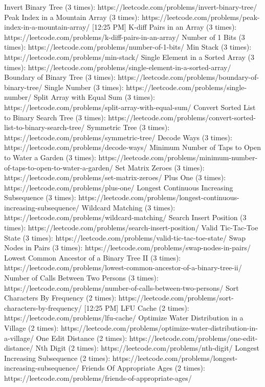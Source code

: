 Invert Binary Tree (3 times): https://leetcode.com/problems/invert-binary-tree/
Peak Index in a Mountain Array (3 times): https://leetcode.com/problems/peak-index-in-a-mountain-array/
[12:25 PM]
K-diff Pairs in an Array (3 times): https://leetcode.com/problems/k-diff-pairs-in-an-array/
Number of 1 Bits (3 times): https://leetcode.com/problems/number-of-1-bits/
Min Stack (3 times): https://leetcode.com/problems/min-stack/
Single Element in a Sorted Array (3 times): https://leetcode.com/problems/single-element-in-a-sorted-array/
Boundary of Binary Tree (3 times): https://leetcode.com/problems/boundary-of-binary-tree/
Single Number (3 times): https://leetcode.com/problems/single-number/
Split Array with Equal Sum (3 times): https://leetcode.com/problems/split-array-with-equal-sum/
Convert Sorted List to Binary Search Tree (3 times): https://leetcode.com/problems/convert-sorted-list-to-binary-search-tree/
Symmetric Tree (3 times): https://leetcode.com/problems/symmetric-tree/
Decode Ways (3 times): https://leetcode.com/problems/decode-ways/
Minimum Number of Taps to Open to Water a Garden (3 times): https://leetcode.com/problems/minimum-number-of-taps-to-open-to-water-a-garden/
Set Matrix Zeroes (3 times): https://leetcode.com/problems/set-matrix-zeroes/
Plus One (3 times): https://leetcode.com/problems/plus-one/
Longest Continuous Increasing Subsequence (3 times): https://leetcode.com/problems/longest-continuous-increasing-subsequence/
Wildcard Matching (3 times): https://leetcode.com/problems/wildcard-matching/
Search Insert Position (3 times): https://leetcode.com/problems/search-insert-position/
Valid Tic-Tac-Toe State (3 times): https://leetcode.com/problems/valid-tic-tac-toe-state/
Swap Nodes in Pairs (3 times): https://leetcode.com/problems/swap-nodes-in-pairs/
Lowest Common Ancestor of a Binary Tree II (3 times): https://leetcode.com/problems/lowest-common-ancestor-of-a-binary-tree-ii/
Number of Calls Between Two Persons (3 times): https://leetcode.com/problems/number-of-calls-between-two-persons/
Sort Characters By Frequency (2 times): https://leetcode.com/problems/sort-characters-by-frequency/
[12:25 PM]
LFU Cache (2 times): https://leetcode.com/problems/lfu-cache/
Optimize Water Distribution in a Village (2 times): https://leetcode.com/problems/optimize-water-distribution-in-a-village/
One Edit Distance (2 times): https://leetcode.com/problems/one-edit-distance/
Nth Digit (2 times): https://leetcode.com/problems/nth-digit/
Longest Increasing Subsequence (2 times): https://leetcode.com/problems/longest-increasing-subsequence/
Friends Of Appropriate Ages (2 times): https://leetcode.com/problems/friends-of-appropriate-ages/
